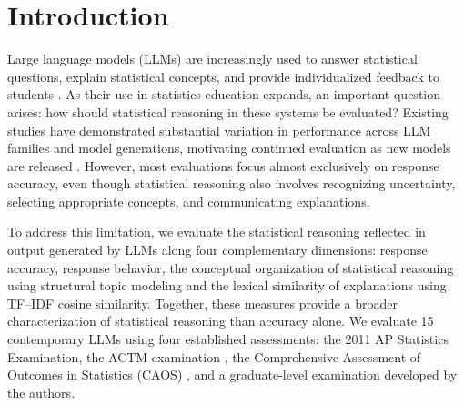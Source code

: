 \documentclass[APA,LATO2COL]{WileyNJDv5}
\begin{document}


\maketitle



\section{Introduction}\label{sec:intro}

Large language models (LLMs) are increasingly used to answer statistical questions, explain statistical concepts, and provide individualized feedback to students \cite{KhanAcademy2024}. As their use in statistics education expands, an important question arises: how should statistical reasoning in these systems be evaluated? Existing studies have demonstrated substantial variation in performance across LLM families and model generations, motivating continued evaluation as new models are released \cite{mcgeesadler2025}. However, most evaluations focus almost exclusively on response accuracy, even though statistical reasoning also involves recognizing uncertainty, selecting appropriate concepts, and communicating explanations.

To address this limitation, we evaluate the statistical reasoning reflected in output generated by LLMs along four complementary dimensions: response accuracy, response behavior, the conceptual organization of statistical reasoning using structural topic modeling and the lexical similarity of explanations using TF--IDF cosine similarity. Together, these measures provide a broader characterization of statistical reasoning than accuracy alone. We evaluate 15 contemporary LLMs using four established assessments: the 2011 AP Statistics Examination, the ACTM examination \cite{ACTMExam}, the Comprehensive Assessment of Outcomes in Statistics (CAOS) \cite{caos}, and a graduate-level examination developed by the authors.
\end{document}
